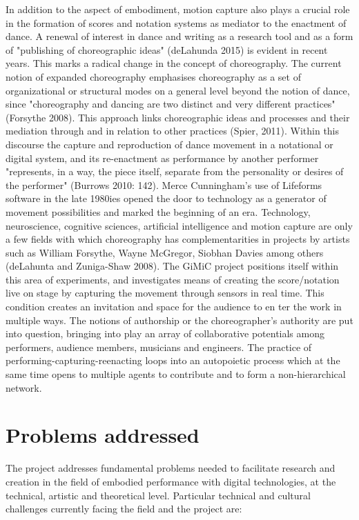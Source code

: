 In addition to the aspect of embodiment, motion capture also plays a crucial role in the formation of scores and notation systems as mediator to the enactment of dance.  A renewal of interest in dance and writing as a research tool and as a form of "publishing of choreographic ideas" (deLahunda 2015) is evident in recent years. This marks a radical change in the concept of choreography. The current notion of expanded choreography emphasises choreography as a set of organizational or structural modes on a general level beyond the notion of dance, since "choreography and dancing are two distinct and very different practices" (Forsythe 2008). This approach links choreographic ideas and processes and their mediation through and in relation to other practices (Spier, 2011).  Within this discourse the capture and reproduction of dance movement in a notational or digital system, and its re-enactment as performance by another performer "represents, in a way, the piece itself, separate from the personality or desires of the performer" (Burrows 2010: 142). Merce Cunningham’s use of Lifeforms software in the late 1980ies opened the door to technology as a generator of movement possibilities and marked the beginning of an era.  Technology, neuroscience, cognitive sciences, artificial intelligence and motion capture are only a few fields with which choreography has complementarities in projects by artists such as William Forsythe, Wayne McGregor, Siobhan Davies among others (deLahunta and Zuniga-Shaw 2008). The GiMiC project positions itself within this area of experiments, and investigates means of creating the score/notation live on stage by capturing the movement through sensors in real time. This condition creates an invitation and space for the audience to en ter the work in multiple ways.  The notions of authorship or the choreographer’s authority are put into question, bringing into play an array of collaborative potentials among performers, audience members, musicians and engineers. The practice of performing-capturing-reenacting loops into an autopoietic process which at the same time opens to multiple agents to contribute and to form a non-hierarchical network.

\section{Problems addressed}
\label{sec:org6cc2b39}
The project addresses fundamental problems needed to facilitate research and creation in the field of embodied performance with digital technologies, at the technical, artistic and theoretical level.  Particular technical and cultural challenges currently facing the field and the project are: 

